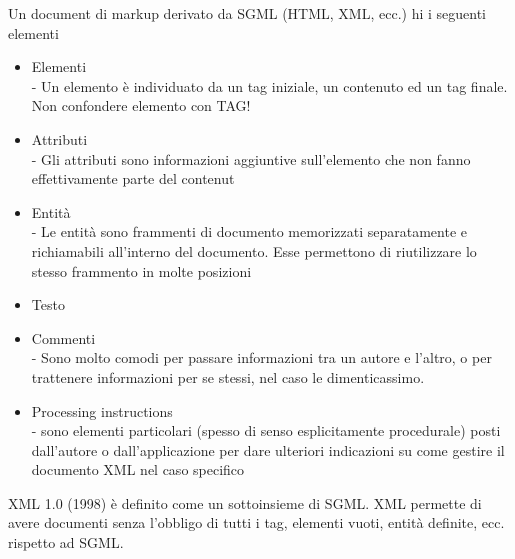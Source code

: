 \documentclass[a4paper,12pt]{article}
\begin{document}
Un document di markup derivato da SGML (HTML, XML, ecc.) hi i seguenti elementi
\begin{itemize}
  \item Elementi \\ 
  - Un elemento è individuato da un tag iniziale, un contenuto ed un tag finale. Non confondere elemento con TAG!
  \item Attributi \\
  - Gli attributi sono informazioni aggiuntive sull’elemento che non fanno effettivamente parte del contenut
  \item Entità \\
  - Le entità sono frammenti di documento memorizzati separatamente e richiamabili all’interno del documento. Esse permettono di riutilizzare lo stesso frammento in molte posizioni 
  \item Testo 
  \item Commenti \\
  - Sono molto comodi per passare informazioni tra un autore e l’altro, o per trattenere informazioni per se stessi, nel caso le dimenticassimo.
  \item Processing instructions \\
  - sono elementi particolari (spesso di senso esplicitamente procedurale) posti dall’autore o dall’applicazione per dare ulteriori indicazioni su come gestire il documento XML nel caso specifico
\end{itemize}
XML 1.0 (1998) è definito come un sottoinsieme di SGML. XML permette di avere documenti senza l'obbligo di tutti i tag, elementi vuoti, entità definite, ecc. rispetto ad SGML.
\end{document}
